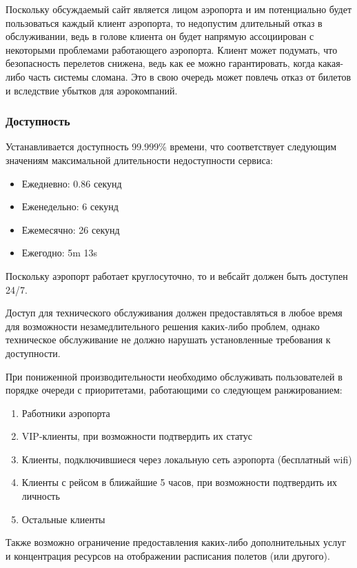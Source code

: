 
Поскольку обсуждаемый сайт является лицом
аэропорта и им потенциально будет пользоваться
каждый клиент аэропорта, то недопустим
длительный отказ в обслуживании, ведь
в голове клиента он будет напрямую ассоциирован
с некоторыми проблемами работающего аэропорта.
Клиент может подумать, что безопасность перелетов
снижена, ведь как ее можно гарантировать, когда
какая-либо часть системы сломана. Это в свою очередь
может повлечь отказ от билетов и вследствие
убытков для аэрокомпаний.

\subsubsection{Доступность}

Устанавливается доступность 99.999\% времени,
что соответствует следующим значениям максимальной
длительности недоступности сервиса:
\begin{itemize}
      \item Ежедневно:   0.86 секунд
      \item Еженедельно: 6 секунд
      \item Ежемесячно:  26 секунд
      \item Ежегодно:    5m 13s
\end{itemize}

Поскольку аэропорт работает круглосуточно, то
и вебсайт должен быть доступен 24/7.

Доступ для технического обслуживания должен
предоставляться в любое время для возможности
незамедлительного решения каких-либо проблем,
однако техническое обслуживание не должно
нарушать установленные требования к доступности.

При пониженной производительности необходимо
обслуживать пользователей в порядке очереди
с приоритетами, работающими со следующем
ранжированием:
\begin{enumerate}
      \item Работники аэропорта
      \item VIP-клиенты, при возможности
            подтвердить их статус
      \item Клиенты, подключившиеся через
            локальную сеть аэропорта (бесплатный wifi)
      \item Клиенты с рейсом в ближайшие 5 часов,
            при возможности подтвердить их личность
      \item Остальные клиенты
\end{enumerate}

Также возможно ограничение предоставления каких-либо
дополнительных услуг и концентрация ресурсов на
отображении расписания полетов (или другого).

